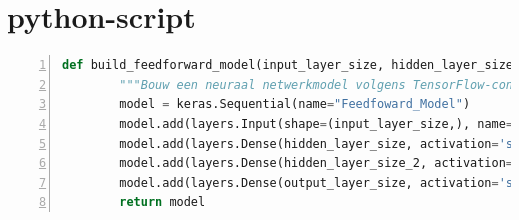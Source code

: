 \section{python-script}
\begin{lstlisting}[language=Python, numbers=left, breaklines=true, basicstyle=\ttfamily\scriptsize]
    def build_feedforward_model(input_layer_size, hidden_layer_size, output_layer_size):
        """Bouw een neuraal netwerkmodel volgens TensorFlow-conventies."""
        model = keras.Sequential(name="Feedfoward_Model")
        model.add(layers.Input(shape=(input_layer_size,), name="Input_Layer"))
        model.add(layers.Dense(hidden_layer_size, activation='sigmoid', name="Hidden_Layer"))
        model.add(layers.Dense(hidden_layer_size_2, activation='sigmoid', name="Hidden_Layer_2"))
        model.add(layers.Dense(output_layer_size, activation='softmax', name="Output_Layer"))
        return model 
\end{lstlisting}
